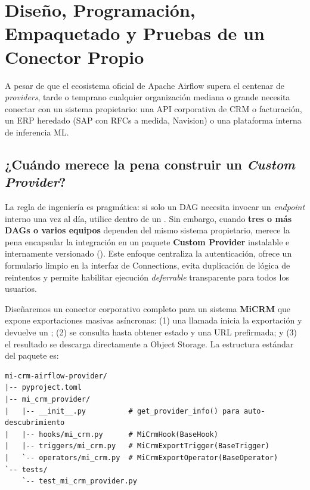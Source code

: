 \section{Diseño, Programación, Empaquetado y Pruebas de un Conector Propio}\label{sec:custom-provider}

A pesar de que el ecosistema oficial de Apache Airflow supera el centenar de \textit{providers}, tarde o temprano cualquier organización mediana o grande necesita conectar con un sistema propietario: una API corporativa de CRM o facturación, un ERP heredado (SAP con RFCs a medida, Navision) o una plataforma interna de inferencia ML.

\subsection{¿Cuándo merece la pena construir un \textit{Custom Provider}?}

La regla de ingeniería es pragmática: si solo un DAG necesita invocar un \textit{endpoint} interno una vez al día, utilice  dentro de un . Sin embargo, cuando \textbf{tres o más DAGs o varios equipos} dependen del mismo sistema propietario, merece la pena encapsular la integración en un paquete \textbf{Custom Provider} instalable e internamente versionado (). Este enfoque centraliza la autenticación, ofrece un formulario limpio en la interfaz de Connections, evita duplicación de lógica de reintentos y permite habilitar ejecución \textit{deferrable} transparente para todos los usuarios.

\begin{examplebox}
Diseñaremos un conector corporativo completo para un sistema \textbf{MiCRM} que expone exportaciones masivas asíncronas: (1) una llamada  inicia la exportación y devuelve un ; (2) se consulta  hasta obtener estado  y una URL prefirmada; y (3) el resultado se descarga directamente a Object Storage. La estructura estándar del paquete es:
\begin{verbatim}
mi-crm-airflow-provider/
|-- pyproject.toml
|-- mi_crm_provider/
|   |-- __init__.py          # get_provider_info() para auto-descubrimiento
|   |-- hooks/mi_crm.py      # MiCrmHook(BaseHook)
|   |-- triggers/mi_crm.py   # MiCrmExportTrigger(BaseTrigger)
|   `-- operators/mi_crm.py  # MiCrmExportOperator(BaseOperator)
`-- tests/
    `-- test_mi_crm_provider.py
\end{verbatim}
\end{examplebox}


